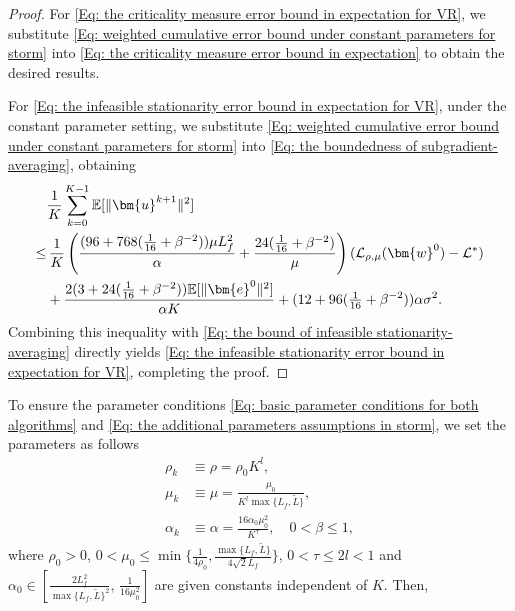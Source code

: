 \documentclass{article}
\theoremstyle{plain}
\theoremstyle{definition}
\theoremstyle{remark}
\newcommand{\EE}{\mathbb{E}}
\newcommand{\be}{\bm{e}}
\newcommand{\bu}{\bm{u}}
\newcommand{\calL}{\mathcal{L}}
\newcommand{\bw}{\bm{w}}
\newcommand{\sumK}{\sum_{k=0}^{K-1}}
\numberwithin{equation}{section}
\begin{document}
\begin{proof}
    For \eqref{Eq: the criticality measure error bound in expectation for VR},
    we substitute \eqref{Eq: weighted cumulative error bound under constant parameters for storm}
    into \eqref{Eq: the criticality measure error bound in expectation} to
    obtain the desired results. 
    
    For \eqref{Eq: the infeasible stationarity error bound in expectation for VR},
    under the constant parameter setting, we substitute \eqref{Eq: weighted cumulative error bound under constant parameters for storm}
    into \eqref{Eq: the boundedness of subgradient-averaging}, obtaining
\begin{align}
&\frac{1}{K}\sumK \EE [\| \bu^{k+1}\|^{2}] \notag \\
\leq & \, \frac{1}{K}\left( \frac{(96+768(\tfrac{1}{16}+\beta^{-2})) \mu L_f^{2}}{\alpha}+ \frac{24(\tfrac{1}{16} + \beta^{-2})}{\mu}\right) ( \calL_{\rho, \mu}(\bw^{0}) - \calL^{*})  \notag\\
& + \frac{ 2( 3 + 24(\tfrac{1}{16} + \beta^{-2}) ) \EE [\| \be^{0}\|^{2}]}{\alpha K} + (12 + 96(\tfrac{1}{16} + \beta^{-2}))\alpha\sigma^{2}. \notag
\end{align}
Combining this inequality with \eqref{Eq: the bound of infeasible stationarity-averaging}
    directly yields \eqref{Eq: the infeasible stationarity error bound in expectation for VR}, completing the proof.
\end{proof}
To ensure the parameter conditions \eqref{Eq: basic parameter conditions for both algorithms} and \eqref{Eq: the additional parameters assumptions in storm}, we set the parameters as follows
\begin{equation}
    \label{Eq: the parameter conditions in VR for analysis}
\begin{aligned}
\rho_{k} &\equiv \rho= \rho_0 K^{l}, \\
\mu_{k} &\equiv \mu= \frac{\mu_0}{K^{l}\max\{L_f, \tilde{L}\}}, \\
\alpha_{k} &\equiv \alpha = \frac{16\alpha_0 \mu_0^{2}}{K^{\tau}},
\quad 0 < \beta \leq 1,
\end{aligned}
\end{equation}
where $\rho_0 > 0$, $0 < \mu_0 \leq \min\{\frac{1}{4\rho_0},\frac{\max\{L_f,\tilde{L}\}}{4\sqrt{2}L_f}\}$, $0 < \tau \leq 2 l < 1$ and
$\alpha_0 \in [\frac{2L_f^2}{\max\{L_f,\tilde{L}\}^2},\,\frac{1}{16\mu_0^{2}}]$ are given constants independent of $K$. Then,
\end{document}
